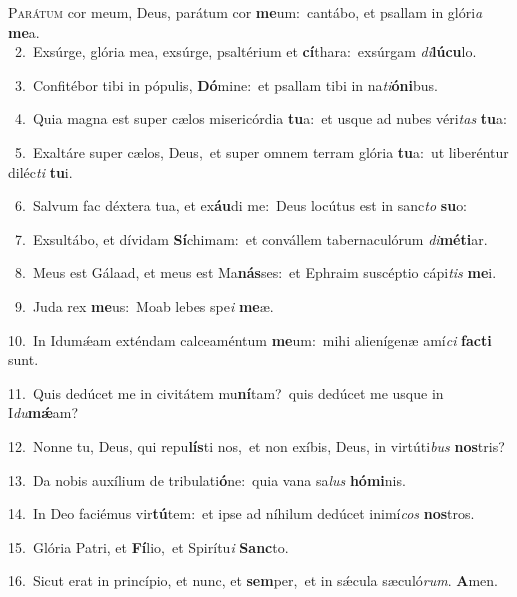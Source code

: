 \lettrine{\initial\textcolor{\initialcolor}{P}}{arátum} cor meum, Deus, parátum cor \textbf{me}\-um:~\star cantábo, et psallam in glóri\textit{a} \textbf{me}\-a.\\
{\numbfont\textcolor{\numbcolor}{~2.}}~Exsúrge, glória mea, exsúrge, psaltérium et \textbf{cí}\-thara:~\star exsúrgam \textit{di}\-\textbf{lú}\textbf{cu}lo.\par
{\numbfont\textcolor{\numbcolor}{~3.}}~Confitébor tibi in pópulis, \textbf{Dó}\-mine:~\star et psallam tibi in na\-\textit{ti}\-\textbf{ó}\textbf{ni}bus.\par
{\numbfont\textcolor{\numbcolor}{~4.}}~Quia magna est super cælos misericórdia \textbf{tu}\-a:~\star et usque ad nubes véri\textit{tas} \textbf{tu}\-a:\par
{\numbfont\textcolor{\numbcolor}{~5.}}~Exaltáre super cælos, Deus,~\dagger et super omnem terram glória \textbf{tu}\-a:~\star ut liberéntur diléc\textit{ti} \textbf{tu}\-i.\par
{\numbfont\textcolor{\numbcolor}{~6.}}~Salvum fac déxtera tua, et ex\-\textbf{áu}\-di me:~\star Deus locútus est in sanc\textit{to} \textbf{su}\-o:\par
{\numbfont\textcolor{\numbcolor}{~7.}}~Exsultábo, et dívidam \textbf{Sí}\-chimam:~\star et convállem tabernaculórum \textit{di}\-\textbf{mé}\textbf{ti}ar.\par
{\numbfont\textcolor{\numbcolor}{~8.}}~Meus est Gálaad, et meus est Ma\-\textbf{nás}\-ses:~\star et Ephraim suscéptio cápi\textit{tis} \textbf{me}\-i.\par
{\numbfont\textcolor{\numbcolor}{~9.}}~Juda rex \textbf{me}\-us:~\star Moab lebes spe\textit{i} \textbf{me}\-æ.\par
{\numbfont\textcolor{\numbcolor}{10.}}~In Idumǽam exténdam calceaméntum \textbf{me}\-um:~\star mihi alienígenæ amí\textit{ci} \textbf{fac}\-\textbf{ti} sunt.\par
{\numbfont\textcolor{\numbcolor}{11.}}~Quis dedúcet me in civitátem mu\-\textbf{ní}\-tam?~\star quis dedúcet me usque in I\-\textit{du}\-\textbf{mǽ}am?\par
{\numbfont\textcolor{\numbcolor}{12.}}~Nonne tu, Deus, qui repu\-\textbf{lís}\-ti nos,~\star et non exíbis, Deus, in virtúti\textit{bus} \textbf{nos}\-tris?\par
{\numbfont\textcolor{\numbcolor}{13.}}~Da nobis auxílium de tribulati\-\textbf{ó}\-ne:~\star quia vana sa\textit{lus} \textbf{hó}\-\textbf{mi}nis.\par
{\numbfont\textcolor{\numbcolor}{14.}}~In Deo faciémus vir\-\textbf{tú}\-tem:~\star et ipse ad níhilum dedúcet inimí\textit{cos} \textbf{nos}\-tros.\par
{\numbfont\textcolor{\numbcolor}{15.}}~Glória Patri, et \textbf{Fí}\-lio,~\star et Spirítu\textit{i} \textbf{Sanc}\-to.\par
{\numbfont\textcolor{\numbcolor}{16.}}~Sicut erat in princípio, et nunc, et \textbf{sem}\-per,~\star et in sǽcula sæculó\-\textit{rum}\-. \textbf{A}\-men.\par
